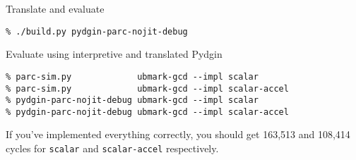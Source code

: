 \begin{task}
\begin{frame}[fragile]{Translate and evaluate}

\begin{Verbatim}[commandchars=\\\{\}]
% cd \midtilde/pydgin/scripts
% ./build.py pydgin-parc-nojit-debug
\end{Verbatim}

Evaluate using interpretive and translated Pydgin

\begin{Verbatim}[commandchars=\\\{\}]
% cd \midtilde/pydgin/bmarks/build
% parc-sim.py             ubmark-gcd --impl scalar
% parc-sim.py             ubmark-gcd --impl scalar-accel
% pydgin-parc-nojit-debug ubmark-gcd --impl scalar
% pydgin-parc-nojit-debug ubmark-gcd --impl scalar-accel
\end{Verbatim}

If you've implemented everything correctly, you should get 163,513 and
108,414 cycles for \texttt{scalar} and \texttt{scalar-accel} respectively.

\end{frame}
\end{task}

